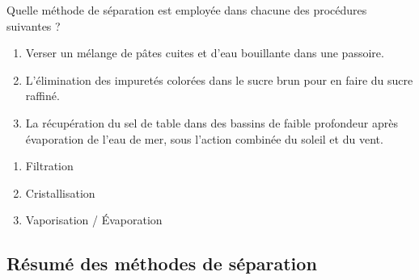\documentclass[
  11pt,
  a4paper,
  openany]{book}
\providecommand{\tightlist}{%
  \setlength{\itemsep}{0pt}\setlength{\parskip}{0pt}}
\begin{document}
\begin{Exercise}

Quelle méthode de séparation est employée dans chacune des procédures suivantes ?

\begin{enumerate}
\def\labelenumi{\arabic{enumi}.}
\tightlist
\item
  Verser un mélange de pâtes cuites et d'eau bouillante dans une passoire.
\item
  L'élimination des impuretés colorées dans le sucre brun pour en faire du sucre raffiné.
\item
  La récupération du sel de table dans des bassins de faible profondeur après évaporation de l'eau de mer, sous l'action combinée du soleil et du vent.
\end{enumerate}

\end{Exercise}

\begin{Answer}

\begin{enumerate}
\def\labelenumi{\arabic{enumi}.}
\tightlist
\item
  Filtration
\item
  Cristallisation
\item
  Vaporisation / Évaporation
\end{enumerate}

\end{Answer}

\hypertarget{ruxe9sumuxe9-des-muxe9thodes-de-suxe9paration}{%
\subsection{Résumé des méthodes de séparation}\label{ruxe9sumuxe9-des-muxe9thodes-de-suxe9paration}}
\end{document}
